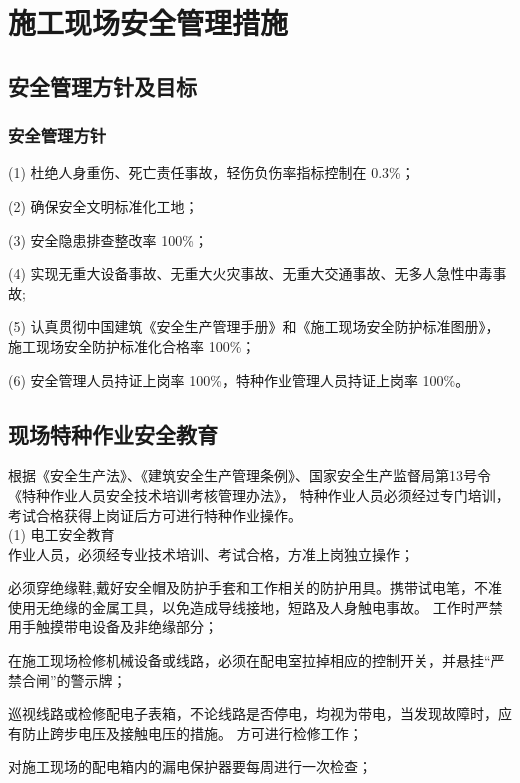 \section{施工现场安全管理措施}
\subsection{安全管理方针及目标}
\subsubsection{安全管理方针}

(1) 杜绝人身重伤、死亡责任事故，轻伤负伤率指标控制在 0.3\%；

(2) 确保安全文明标准化工地；

(3) 安全隐患排查整改率 100\%；

(4) 实现无重大设备事故、无重大火灾事故、无重大交通事故、无多人急性中毒事故;

(5) 认真贯彻中国建筑《安全生产管理手册》和《施工现场安全防护标准图册》，施工现场安全防护标准化合格率 100\%；

(6) 安全管理人员持证上岗率 100\%，特种作业管理人员持证上岗率 100\%。

\subsection{现场特种作业安全教育}

根据《安全生产法》、《建筑安全生产管理条例》、国家安全生产监督局第13号令《特种作业人员安全技术培训考核管理办法》，
特种作业人员必须经过专门培训，考试合格获得上岗证后方可进行特种作业操作。\\

(1) 电工安全教育\\

 作业人员，必须经专业技术培训、考试合格，方准上岗独立操作；

 必须穿绝缘鞋,戴好安全帽及防护手套和工作相关的防护用具。携带试电笔，不准使用无绝缘的金属工具，以免造成导线接地，短路及人身触电事故。
工作时严禁用手触摸带电设备及非绝缘部分；

 在施工现场检修机械设备或线路，必须在配电室拉掉相应的控制开关，并悬挂“严禁合闸”的警示牌；

 巡视线路或检修配电子表箱，不论线路是否停电，均视为带电，当发现故障时，应有防止跨步电压及接触电压的措施。
方可进行检修工作；

 对施工现场的配电箱内的漏电保护器要每周进行一次检查；\\


